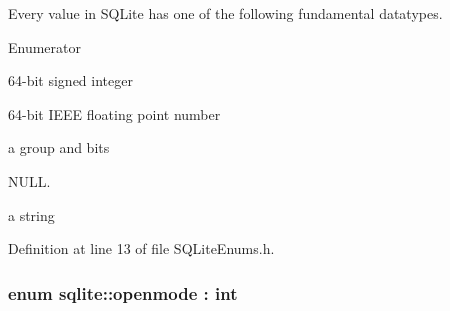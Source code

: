 Every value in S\-Q\-Lite has one of the following fundamental datatypes. 

\begin{Desc}
\item[Enumerator]\par
\begin{description}
\item[{\em 
\hypertarget{a00038_a7467e5cdd32bbf7fce35aced88682dc0a157db7df530023575515d366c9b672e8}{integer}\label{a00038_a7467e5cdd32bbf7fce35aced88682dc0a157db7df530023575515d366c9b672e8}
}]64-\/bit signed integer \item[{\em 
\hypertarget{a00038_a7467e5cdd32bbf7fce35aced88682dc0a374515b23d6f106696387776a6077d17}{floating}\label{a00038_a7467e5cdd32bbf7fce35aced88682dc0a374515b23d6f106696387776a6077d17}
}]64-\/bit I\-E\-E\-E floating point number \item[{\em 
\hypertarget{a00038_a7467e5cdd32bbf7fce35aced88682dc0aee26908bf9629eeb4b37dac350f4754a}{blob}\label{a00038_a7467e5cdd32bbf7fce35aced88682dc0aee26908bf9629eeb4b37dac350f4754a}
}]a group and bits \item[{\em 
\hypertarget{a00038_a7467e5cdd32bbf7fce35aced88682dc0a37a6259cc0c1dae299a7866489dff0bd}{null}\label{a00038_a7467e5cdd32bbf7fce35aced88682dc0a37a6259cc0c1dae299a7866489dff0bd}
}]N\-U\-L\-L. \item[{\em 
\hypertarget{a00038_a7467e5cdd32bbf7fce35aced88682dc0a1cb251ec0d568de6a929b520c4aed8d1}{text}\label{a00038_a7467e5cdd32bbf7fce35aced88682dc0a1cb251ec0d568de6a929b520c4aed8d1}
}]a string \end{description}
\end{Desc}


Definition at line 13 of file S\-Q\-Lite\-Enums.\-h.

\hypertarget{a00038_ac886eded97b0430b2ab92e2d08fcf938}{
\subsubsection[{openmode}]{\setlength{\rightskip}{0pt plus 5cm}enum {\bf sqlite\-::openmode} \-: int\hspace{0.3cm}{\ttfamily [strong]}}}\label{a00038_ac886eded97b0430b2ab92e2d08fcf938}


